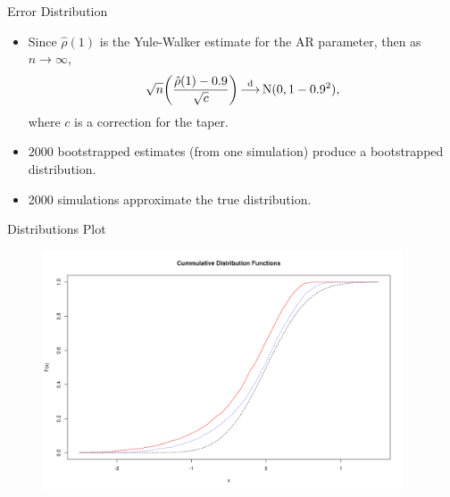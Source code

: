 
\begin{frame}{Error Distribution}
\begin{itemize}
    \item
    Since $\hat{\rho}(1)$ is the Yule-Walker estimate for the AR parameter,
    then as $n \to \infty$,
        \[
        \sqrt{n} \biggl( \frac{\hat{\rho}(1) - 0.9}{\sqrt{c}} \biggr)
        \mathop{\overset{\mathrm{d}}{\longrightarrow}}
        \operatorname{N}(0, 1 - 0.9^2),
        \]
    where $c$ is a correction for the taper.

    \item
    $2000$ bootstrapped estimates (from one simulation)
    produce a bootstrapped distribution.

    \item
    2000 simulations approximate the true distribution.
\end{itemize}
\end{frame}

\begin{frame}{Distributions Plot}
    \begin{figure}
    \centering
    \includegraphics[width = 0.95\textwidth]{res/ex1_cdf.png}
    \end{figure}
\end{frame}


